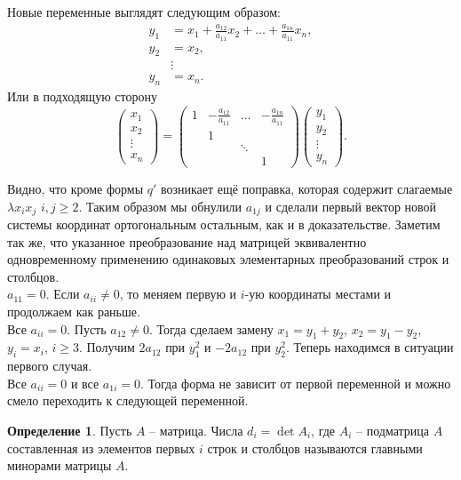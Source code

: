 \documentclass[10pt,a4paper,oneside]{book} %
\theoremstyle{definition}
\newtheorem*{defn}{Определение}
\def\dfn{\begin{defn}}
\def\edfn{\end{defn}}
\def\pmat{\begin{pmatrix}}
\def\epmat{\end{pmatrix}}
\begin{document}
Новые переменные выглядят следующим образом:
\begin{align*}
y_1&=x_1+\frac{a_{12}}{a_{11}}x_2 + \dots +\frac{a_{1n}}{a_{11}}x_n,\\
 y_2&=x_2, \\
&\vdots\\
 y_n&=x_n.
\end{align*}
Или в подходящую сторону
$$ \pmat x_1 \\ x_2 \\ \vdots \\ x_n \epmat = \pmat 1 & -\frac{a_{12}}{a_{11}} & \dots & -\frac{a_{1n}}{a_{11}} \\
& 1 && \\
& & \ddots & \\
&&& 1
\epmat \pmat y_1 \\ y_2 \\ \vdots \\ y_n \epmat.
$$

Видно, что кроме формы $q'$ возникает ещё поправка, которая содержит слагаемые $\lambda x_ix_j$ $i,j\geq 2$. Таким образом мы обнулили $a_{1j}$ и сделали первый вектор новой системы координат ортогональным остальным, как и в доказательстве. Заметим так же, что указанное преобразование над матрицей эквивалентно одновременному применению одинаковых элементарных преобразований строк и столбцов.\\




 $a_{11}=0$. Если $a_{ii}\neq 0$, то меняем первую и $i$-ую координаты местами  и продолжаем как раньше. \\


 Все $a_{ii}=0$.
Пусть $a_{12}\neq 0$. Тогда сделаем замену $x_1=y_1+y_2$, $x_2=y_1-y_2$, $y_i=x_i$, $i\geq 3$. Получим $2a_{12}$ при $y_1^2$ и $-2a_{12}$ при $y_2^2$. Теперь находимся в ситуации первого случая.\\


 Все $a_{ii}=0$ и все $a_{1i}=0$. Тогда форма не зависит от первой переменной и можно смело переходить к следующей переменной.\\ 

\dfn Пусть $A$ -- матрица. Числа $d_i=\det A_i$, где $A_i$ -- подматрица $A$ составленная из элементов первых $i$ строк и столбцов  называются главными минорами матрицы $A$.
\edfn
\end{document}
